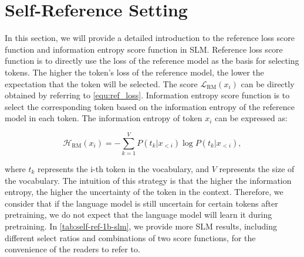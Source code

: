\section{Self-Reference Setting}
\label{sec:appendix:self-reference-setting}



In this section, we will provide a detailed introduction to the reference loss score function and information entropy score function in SLM. Reference loss score function is to directly use the loss of the reference model as the basis for selecting tokens. The higher the token's loss of the reference model, the lower the expectation that the token will be selected. The score $\mathcal{L}_{\text{RM}}(x_i)$ can be directly obtained by referring to \autoref{equ:ref_loss}. Information entropy score function is to select the corresponding token based on the information entropy of the reference model in each token. The information entropy of token $x_i$ can be expressed as:



\begin{equation}
\mathcal{H}_{\text{RM}}(x_i) = -\sum_{k=1}^{V} P(t_k|x_{<i}) \log P(t_k|x_{<i}),
\end{equation}

where $t_k$ represents the i-th token in the vocabulary, and $V$ represents the size of the vocabulary. The intuition of this strategy is that the higher the information entropy, the higher the uncertainty of the token in the context. Therefore, we consider that if the language model is still uncertain for certain tokens after pretraining, we do not expect that the language model will learn it during pretraining. In \autoref{tab:self-ref-1b-slm}, we provide more SLM results, including different select ratios and combinations of two score functions, for the convenience of the readers to refer to.



